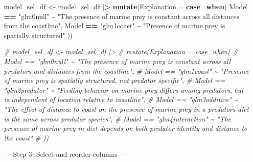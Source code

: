 \documentclass[
]{article}
\newenvironment{Shaded}{\begin{snugshade}}{\end{snugshade}}
\newcommand{\AttributeTok}[1]{\textcolor[rgb]{0.13,0.29,0.53}{#1}}
\newcommand{\CommentTok}[1]{\textcolor[rgb]{0.56,0.35,0.01}{\textit{#1}}}
\newcommand{\FunctionTok}[1]{\textcolor[rgb]{0.13,0.29,0.53}{\textbf{#1}}}
\newcommand{\NormalTok}[1]{#1}
\newcommand{\OtherTok}[1]{\textcolor[rgb]{0.56,0.35,0.01}{#1}}
\newcommand{\SpecialCharTok}[1]{\textcolor[rgb]{0.81,0.36,0.00}{\textbf{#1}}}
\newcommand{\StringTok}[1]{\textcolor[rgb]{0.31,0.60,0.02}{#1}}
\begin{document}
\begin{Shaded}
\begin{Highlighting}[]
\NormalTok{model\_sel\_df }\OtherTok{\textless{}{-}}\NormalTok{ model\_sel\_df }\SpecialCharTok{|\textgreater{}} 
  \FunctionTok{mutate}\NormalTok{(}\AttributeTok{Explanation =} \FunctionTok{case\_when}\NormalTok{(}
\NormalTok{  Model }\SpecialCharTok{==} \StringTok{"glm0null"} \SpecialCharTok{\textasciitilde{}} \StringTok{"The presence of marine prey is constant across all distances from the coastline"}\NormalTok{,}
\NormalTok{  Model }\SpecialCharTok{==} \StringTok{"glm1coast"} \SpecialCharTok{\textasciitilde{}} \StringTok{"Presence of marine prey is spatially structured"}
\NormalTok{))}

\CommentTok{\# model\_sel\_df \textless{}{-} model\_sel\_df |\textgreater{} }
\CommentTok{\#   mutate(Explanation = case\_when(}
\CommentTok{\#   Model == "glm0null" \textasciitilde{} "The presence of marine prey is constant across all predators and distances from the coastline",}
\CommentTok{\#   Model == "glm1coast" \textasciitilde{} "Presence of marine prey is spatially structured, not predator specific",}
\CommentTok{\#   Model == "glm2predator" \textasciitilde{} "Feeding behavior on marine prey differs among predators, but is independent of location relative to coastline",}
\CommentTok{\#   Model == "glm3additive" \textasciitilde{} "The effect of distance to coast on the presence of marine prey in a predator\textquotesingle{}s diet is the same across predator species",}
\CommentTok{\#   Model == "glm4interaction" \textasciitilde{} "The presence of marine prey in diet depends on both predator identity and distance to the coast"}
\CommentTok{\# ))}
\end{Highlighting}
\end{Shaded}

--- Step 3: Select and reorder columns ---
\end{document}
